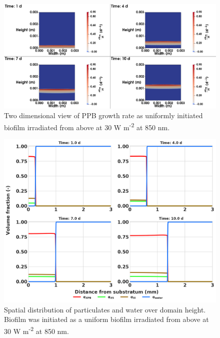 \begin{figure}[H]
    \centering
     \hspace*{-1cm}\includegraphics[width=1.1\textwidth,height=0.4\textheight]{Chap4/methods/data/figures/case4_growth_frac.png}
    \caption{Two dimensional view of PPB growth rate as uniformly initiated biofilm irradiated from above at 30 W m\textsuperscript{-2} at 850 nm.} 
    \label{fig:case4_growth_frac}
\end{figure}

\begin{figure}[H]
    \centering
    \includegraphics[width=\textwidth,height=0.45\textheight]{Chap4/methods/output/case4.png}
    \caption{Spatial distribution of particulates and water over domain height. Biofilm was initiated as a uniform biofilm irradiated from above at 30 W m\textsuperscript{-2} at 850 nm.} 
    \label{fig:case4_dist_frac}
\end{figure}



